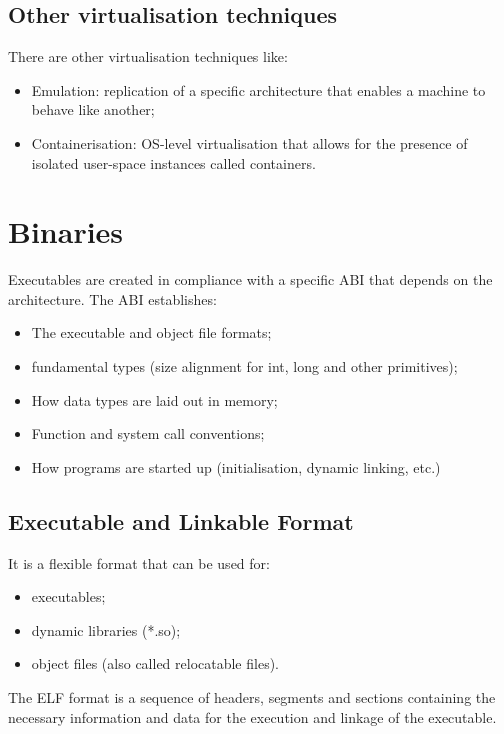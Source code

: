 \subsection{Other virtualisation techniques}
There are other virtualisation techniques like: 
\begin{itemize} 
    \item Emulation: replication of a specific architecture that enables a machine to behave like another;
    \item Containerisation: OS-level virtualisation that allows for the presence of isolated user-space instances 
        called containers.  
\end{itemize} 
\section{Binaries} 
Executables are created in compliance with a specific ABI that depends on the architecture. The ABI establishes: 
\begin{itemize} 
    \item The executable and object file formats;
    \item fundamental types (size alignment for int, long and other primitives);
    \item How data types are laid out in memory;
    \item Function and system call conventions;
    \item How programs are started up (initialisation, dynamic linking, etc.) 
\end{itemize}
\subsection{Executable and Linkable Format} It is a flexible format that can be used for:
\begin{itemize}
    \item executables; 
    \item dynamic libraries (*.so);
    \item object files (also called relocatable files).
\end{itemize}
The ELF format is a sequence of headers, segments and sections containing the necessary information and data for the 
execution and linkage of the executable.

